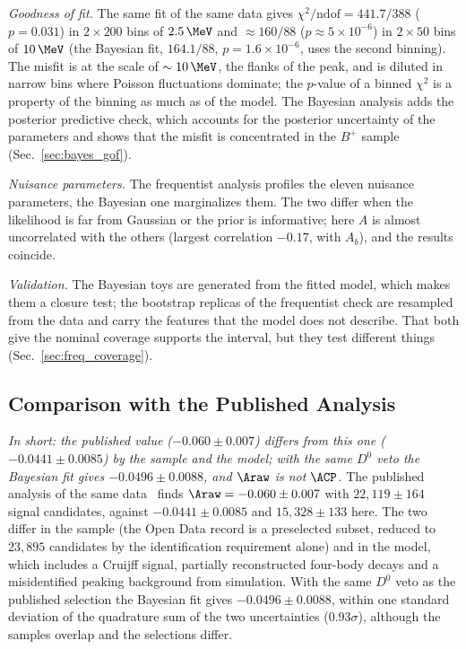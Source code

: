 \emph{Goodness of fit.} The same fit of the same data gives $\chi^2/\mathrm{ndof}=441.7/388$ ($p=0.031$) in $2\times200$ bins of $2.5\,\MeV$ and $\approx160/88$ ($p\approx5\times10^{-6}$) in $2\times50$ bins of $10\,\MeV$ (the Bayesian fit, $164.1/88$, $p=1.6\times10^{-6}$, uses the second binning). The misfit is at the scale of $\sim10\,\MeV$, the flanks of the peak, and is diluted in narrow bins where Poisson fluctuations dominate; the $p$-value of a binned $\chi^2$ is a property of the binning as much as of the model. The Bayesian analysis adds the posterior predictive check, which accounts for the posterior uncertainty of the parameters and shows that the misfit is concentrated in the $B^+$ sample (Sec.~\ref{sec:bayes_gof}).

\emph{Nuisance parameters.} The frequentist analysis profiles the eleven nuisance parameters, the Bayesian one marginalizes them. The two differ when the likelihood is far from Gaussian or the prior is informative; here $A$ is almost uncorrelated with the others (largest correlation $-0.17$, with $A_b$), and the results coincide.

\emph{Validation.} The Bayesian toys are generated from the fitted model, which makes them a closure test; the bootstrap replicas of the frequentist check are resampled from the data and carry the features that the model does not describe. That both give the nominal coverage supports the interval, but they test different things (Sec.~\ref{sec:freq_coverage}).

\subsection{Comparison with the Published Analysis}
\label{sec:comparison_published}
\emph{In short: the published value ($-0.060\pm0.007$) differs from this one ($-0.0441\pm0.0085$) by the sample and the model; with the same $D^0$ veto the Bayesian fit gives $-0.0496\pm0.0088$, and $\Araw$ is not $\ACP$.}
The published analysis of the same data~\cite{lhcb_cpv_2013} finds $\Araw=-0.060\pm0.007$ with $22{,}119\pm164$ signal candidates, against $-0.0441\pm0.0085$ and $15{,}328\pm133$ here. The two differ in the sample (the Open Data record is a preselected subset, reduced to $23{,}895$ candidates by the identification requirement alone) and in the model, which includes a Cruijff signal, partially reconstructed four-body decays and a misidentified peaking background from simulation. With the same $D^0$ veto as the published selection the Bayesian fit gives $-0.0496\pm0.0088$, within one standard deviation of the quadrature sum of the two uncertainties ($0.93\sigma$), although the samples overlap and the selections differ.

